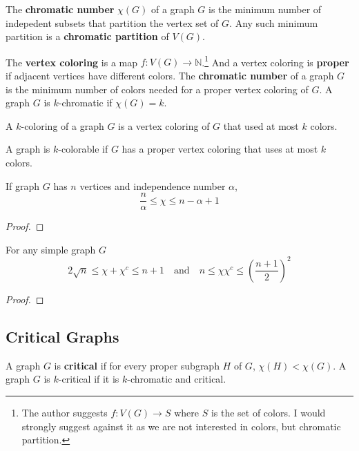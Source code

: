 \begin{definition}
	The \textbf{chromatic number} $\chi(G)$ of a graph $G$ is the minimum number of indepedent subsets that partition the vertex set of $G$. Any such minimum partition is a \textbf{chromatic partition} of $V(G)$.
\end{definition}

\begin{definition}
	The \textbf{vertex coloring} is a map $f : V(G) \to \mathbb{N}$.\footnote{The author suggests $f : V(G) \to S$ where $S$ is the set of colors. I would strongly suggest against it as we are not interested in colors, but chromatic partition.}  And a vertex coloring is \textbf{proper} if adjacent vertices have different colors. The \textbf{chromatic number} of a graph $G$ is the minimum number of colors needed for a proper vertex coloring of $G$. A graph $G$ is $k$-chromatic if $\chi(G) = k$.
\end{definition}

\begin{definition}
	A $k$-coloring of a graph $G$ is a vertex coloring of $G$ that used at most $k$ colors.
\end{definition}

\begin{definition}
	A graph is $k$-colorable if $G$ has a proper vertex coloring that uses at most $k$ colors.
\end{definition}

\begin{theorem}
	If graph $G$ has $n$ vertices and independence number $\alpha$,
	$$ \frac{n}{\alpha} \le \chi \le n-\alpha+1 $$
\end{theorem}
\begin{proof}
\end{proof}

\begin{theorem}
	For any simple graph $G$
	$$ 2\sqrt{n} \le \chi + \chi^c \le n+1 \quad \text{and} \quad n \le \chi\chi^c \le \left(\frac{n+1}{2}\right)^2 $$
\end{theorem}
\begin{proof}
\end{proof}

\subsection{Critical Graphs}
\begin{definition}
	A graph $G$ is \textbf{critical} if for every proper subgraph $H$ of $G$, $\chi(H) < \chi(G)$. A graph $G$ is $k$-critical if it is $k$-chromatic and critical.
\end{definition}

